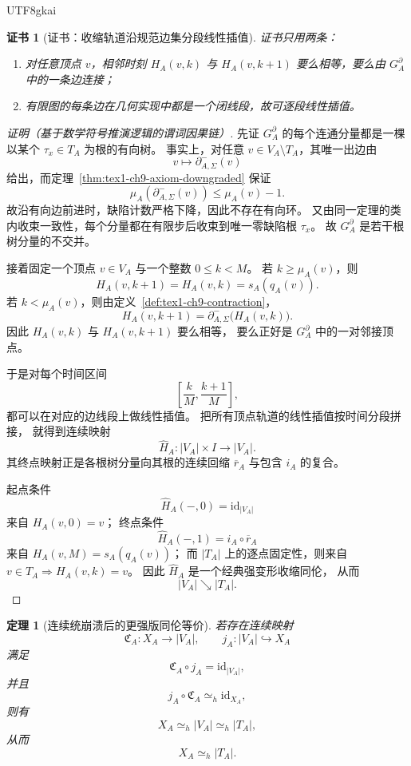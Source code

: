 \documentclass[12pt]{article}
\newtheorem{theorem}{定理}[section]
\newtheorem{Certificate}{证书}[section]
\newcommand{\id}{\mathrm{id}}
\begin{document}
\begin{CJK*}{UTF8}{gkai}
\begin{Certificate}[证书：收缩轨道沿规范边集分段线性插值]
\label{cert:tex1-ch9-realization}
证书只用两条：
\begin{enumerate}
  \item 对任意顶点 \(v\)，相邻时刻 \(H_A(v,k)\) 与 \(H_A(v,k+1)\) 要么相等，要么由 \(G_A^\partial\) 中的一条边连接；
  \item 有限图的每条边在几何实现中都是一个闭线段，故可逐段线性插值。
\end{enumerate}
\end{Certificate}

\begin{proof}[证明（基于数学符号推演逻辑的谓词因果链）]
先证 \(G_A^\partial\) 的每个连通分量都是一棵以某个 \(\tau_x\in T_A\) 为根的有向树。
事实上，对任意 \(v\in V_A\setminus T_A\)，其唯一出边由
\[
  v\longmapsto \partial^-_{A,\Sigma}(v)
\]
给出，而定理~\ref{thm:tex1-ch9-axiom-downgraded} 保证
\[
  \mu_A(\partial^-_{A,\Sigma}(v))\le \mu_A(v)-1.
\]
故沿有向边前进时，缺陷计数严格下降，因此不存在有向环。
又由同一定理的类内收束一致性，每个分量都在有限步后收束到唯一零缺陷根 \(\tau_x\)。
故 \(G_A^\partial\) 是若干根树分量的不交并。

接着固定一个顶点 \(v\in V_A\) 与一个整数 \(0\le k<M\)。
若 \(k\ge \mu_A(v)\)，则
\[
  H_A(v,k+1)=H_A(v,k)=s_A(q_A(v)).
\]
若 \(k<\mu_A(v)\)，则由定义~\ref{def:tex1-ch9-contraction}，
\[
  H_A(v,k+1)
  =
  \partial^-_{A,\Sigma}\!\bigl(H_A(v,k)\bigr).
\]
因此 \(H_A(v,k)\) 与 \(H_A(v,k+1)\) 要么相等，
要么正好是 \(G_A^\partial\) 中的一对邻接顶点。

于是对每个时间区间
\[
  \left[\frac{k}{M},\frac{k+1}{M}\right],
\]
都可以在对应的边线段上做线性插值。
把所有顶点轨道的线性插值按时间分段拼接，
就得到连续映射
\[
  \widehat H_A:|V_A|\times I\to |V_A|.
\]
其终点映射正是各根树分量向其根的连续回缩 \(\overline r_A\) 与包含 \(i_A\) 的复合。

起点条件
\[
  \widehat H_A(-,0)=\id_{|V_A|}
\]
来自 \(H_A(v,0)=v\)；
终点条件
\[
  \widehat H_A(-,1)=i_A\circ \overline r_A
\]
来自 \(H_A(v,M)=s_A(q_A(v))\)；
而 \(|T_A|\) 上的逐点固定性，则来自 \(v\in T_A\Rightarrow H_A(v,k)=v\)。
因此 \(\widehat H_A\) 是一个经典强变形收缩同伦，
从而
\[
  |V_A|\searrow |T_A|.
\]
\end{proof}

\begin{theorem}[连续统崩溃后的更强版同伦等价]
\label{thm:tex1-ch9-collapse-equivalence}
若存在连续映射
\[
  \mathfrak C_A:X_A\to |V_A|,
  \qquad
  j_A:|V_A|\hookrightarrow X_A
\]
满足
\[
  \mathfrak C_A\circ j_A=\id_{|V_A|},
\]
并且
\[
  j_A\circ \mathfrak C_A \simeq_h \id_{X_A},
\]
则有
\[
  X_A \simeq_h |V_A| \simeq_h |T_A|,
\]
从而
\[
  \boxed{
    X_A \simeq_h |T_A|.
  }
\]
\end{theorem}


\end{CJK*}
\end{document}
